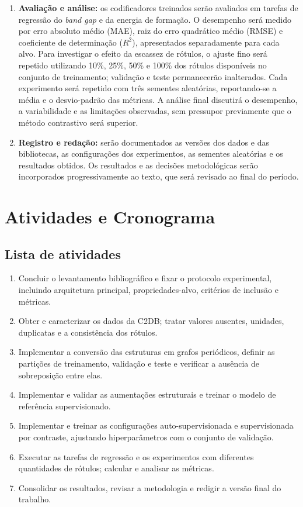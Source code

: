 \begin{enumerate}
    \item \textbf{Avaliação e análise:} os codificadores treinados serão avaliados em tarefas de regressão do \textit{band gap} e da energia de formação. O desempenho será medido por erro absoluto médio (MAE), raiz do erro quadrático médio (RMSE) e coeficiente de determinação ($R^2$), apresentados separadamente para cada alvo. Para investigar o efeito da escassez de rótulos, o ajuste fino será repetido utilizando 10\%, 25\%, 50\% e 100\% dos rótulos disponíveis no conjunto de treinamento; validação e teste permanecerão inalterados. Cada experimento será repetido com três sementes aleatórias, reportando-se a média e o desvio-padrão das métricas. A análise final discutirá o desempenho, a variabilidade e as limitações observadas, sem pressupor previamente que o método contrastivo será superior.

    \item \textbf{Registro e redação:} serão documentados as versões dos dados e das bibliotecas, as configurações dos experimentos, as sementes aleatórias e os resultados obtidos. Os resultados e as decisões metodológicas serão incorporados progressivamente ao texto, que será revisado ao final do período.
\end{enumerate}

\section{Atividades e Cronograma}

\subsection{Lista de atividades}

\begin{enumerate}
    \item Concluir o levantamento bibliográfico e fixar o protocolo experimental, incluindo arquitetura principal, propriedades-alvo, critérios de inclusão e métricas.
    \item Obter e caracterizar os dados da C2DB; tratar valores ausentes, unidades, duplicatas e a consistência dos rótulos.
    \item Implementar a conversão das estruturas em grafos periódicos, definir as partições de treinamento, validação e teste e verificar a ausência de sobreposição entre elas.
    \item Implementar e validar as aumentações estruturais e treinar o modelo de referência supervisionado.
    \item Implementar e treinar as configurações auto-supervisionada e supervisionada por contraste, ajustando hiperparâmetros com o conjunto de validação.
    \item Executar as tarefas de regressão e os experimentos com diferentes quantidades de rótulos; calcular e analisar as métricas.
    \item Consolidar os resultados, revisar a metodologia e redigir a versão final do trabalho.
\end{enumerate}

